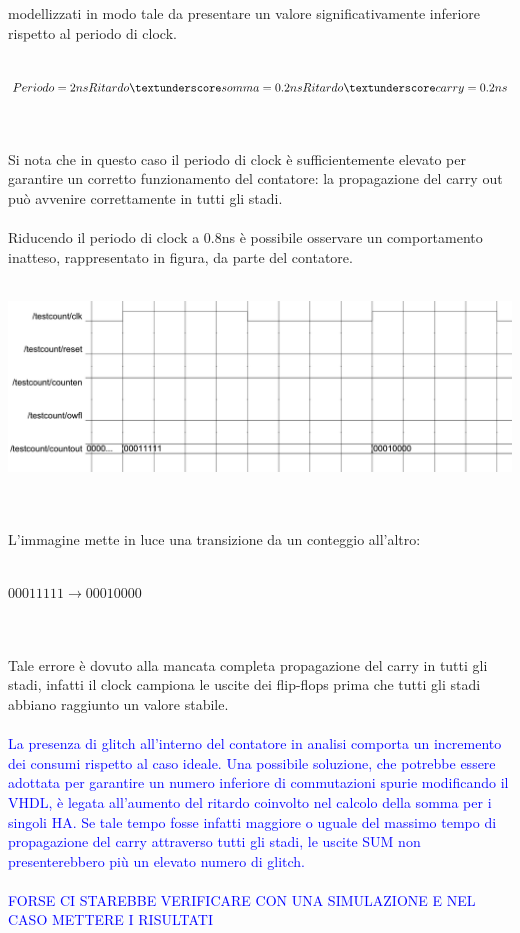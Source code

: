 \documentclass[11pt,  english, makeidx, a4paper, titlepage, oneside]{book}
\begin{document}
modellizzati in modo tale da presentare un valore significativamente
inferiore rispetto al periodo di clock.
\\\\
\centerline{$Periodo = 2ns \\
            Ritardo\textunderscore somma = 0.2ns \\
            Ritardo\textunderscore carry = 0.2ns $}
\\\\
Si nota che in questo caso il periodo di clock è 
sufficientemente elevato per garantire un corretto funzionamento 
del contatore: la propagazione del carry out può avvenire correttamente
in tutti gli stadi.
\\\\
Riducendo il periodo di clock a 0.8ns è possibile osservare un
comportamento inatteso, rappresentato in figura, da parte del contatore.
\\\\
\centerline{\includegraphics[width=15cm]{./img/Lab_1/Es_5/Clk_corto.png}}
\\\\
L'immagine mette in luce una transizione da un conteggio all'altro:
\\\\
\centerline{$00011111 \rightarrow 00010000$}
\\\\
Tale errore è dovuto alla mancata completa propagazione del carry in tutti
gli stadi, infatti il clock campiona le uscite dei flip-flops prima che tutti
gli stadi abbiano raggiunto un valore stabile. 
\\\\
\textcolor{blue}{La presenza di glitch all'interno del contatore in analisi comporta
un incremento dei consumi rispetto al caso ideale. Una possibile soluzione, che potrebbe
essere adottata per garantire un numero inferiore di commutazioni spurie modificando il VHDL, è legata
all'aumento del ritardo coinvolto nel calcolo della somma per i singoli HA. 
Se tale tempo fosse infatti maggiore o uguale del massimo tempo di propagazione 
del carry attraverso tutti gli stadi, le uscite SUM non presenterebbero più un elevato numero di glitch.
\\\\
FORSE CI STAREBBE VERIFICARE CON UNA SIMULAZIONE E NEL CASO METTERE I RISULTATI}
\end{document}
